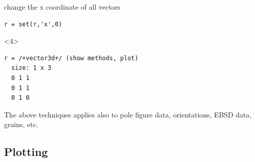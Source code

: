 \documentclass[compress]{beamer}
\begin{document}
\begin{frame}[fragile]
\begin{overlayarea}{\textwidth}{8cm}
  \pause \medskip

  change the x coordinate of all vectors
    \begin{lstlisting}[style=input]
r = set(r,'x',0)
    \end{lstlisting}
        \begin{onlyenv}<4>
          \vspace{-0.3cm}
      \begin{lstlisting}[style=output]
r = /+vector3d+/ (show methods, plot)
  size: 1 x 3
  0 1 1
  0 1 1
  0 1 0
     \end{lstlisting}
    \end{onlyenv}

    \pause \medskip

    \alert{The above techniques applies also to pole figure data,
    orientations, EBSD data, grains, etc.}
  \end{overlayarea}


\end{frame}


\subsection*{Plotting}
\label{sec:plotting}
\end{document}
